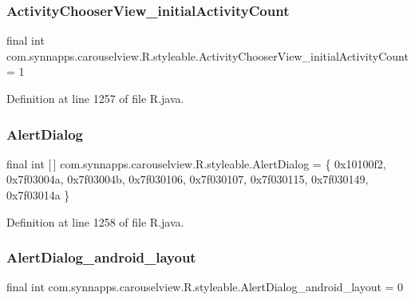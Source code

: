 \subsubsection{\texorpdfstring{ActivityChooserView\_initialActivityCount}{ActivityChooserView\_initialActivityCount}}
{\footnotesize\ttfamily final int com.\+synnapps.\+carouselview.\+R.\+styleable.\+Activity\+Chooser\+View\+\_\+initial\+Activity\+Count = 1\hspace{0.3cm}{\ttfamily [static]}}



Definition at line 1257 of file R.\+java.

\mbox{\label{classcom_1_1synnapps_1_1carouselview_1_1_r_1_1styleable_acfeebbc3f8dd27d8095374264f038c79}} 
\subsubsection{\texorpdfstring{AlertDialog}{AlertDialog}}
{\footnotesize\ttfamily final int \mbox{[}$\,$\mbox{]} com.\+synnapps.\+carouselview.\+R.\+styleable.\+Alert\+Dialog = \{ 0x10100f2, 0x7f03004a, 0x7f03004b, 0x7f030106, 0x7f030107, 0x7f030115, 0x7f030149, 0x7f03014a \}\hspace{0.3cm}{\ttfamily [static]}}



Definition at line 1258 of file R.\+java.

\mbox{\label{classcom_1_1synnapps_1_1carouselview_1_1_r_1_1styleable_aea08bdcea74ae759f83a8a24c7421f86}} 
\subsubsection{\texorpdfstring{AlertDialog\_android\_layout}{AlertDialog\_android\_layout}}
{\footnotesize\ttfamily final int com.\+synnapps.\+carouselview.\+R.\+styleable.\+Alert\+Dialog\+\_\+android\+\_\+layout = 0\hspace{0.3cm}{\ttfamily [static]}}



